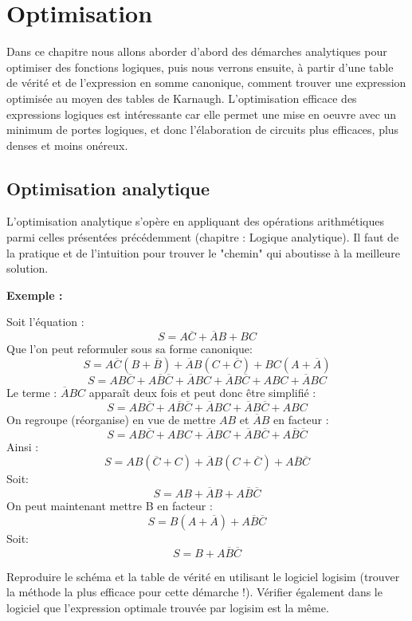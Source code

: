 \documentclass[a4paper,11pt]{book}
\theoremstyle{definition}
\theoremstyle{definition}
\begin{document}
\chapter{Optimisation}
Dans ce chapitre nous allons aborder d'abord des démarches analytiques pour optimiser des fonctions logiques, puis nous verrons ensuite, à partir d'une table de vérité et de l'expression en somme canonique, comment trouver une expression optimisée au moyen des tables de Karnaugh.
L'optimisation efficace des expressions logiques est intéressante car elle permet une mise en oeuvre avec un minimum de portes logiques, et donc l'élaboration de circuits plus efficaces, plus denses et moins onéreux.

\section{Optimisation analytique}
L'optimisation analytique s'opère en appliquant des opérations arithmétiques parmi celles présentées précédemment (chapitre : Logique analytique). Il faut de la pratique et de l'intuition pour trouver le "chemin" qui aboutisse à la meilleure solution.

\textbf{Exemple :}

Soit l'équation :
\[ S = A\overline{C} + \overline{A}B + BC\]
Que l'on peut reformuler sous sa forme canonique:
\[ S = A\overline{C}(B+\overline{B}) + \overline{A}B(C+\overline{C}) + BC(A+\overline{A}) \]
\[ S = AB\overline{C} + A\overline{B}\overline{C} + \overline{A}BC + \overline{A}B\overline{C}+ABC+\overline{A}BC \]
Le terme : $\overline{A}BC$ apparaît deux fois et peut donc être simplifié :
\[ S = AB\overline{C} + A\overline{B}\overline{C} + \overline{A}BC + \overline{A}B\overline{C}+ABC \]
On regroupe (réorganise) en vue de mettre $AB$ et $\overline{A}B$ en facteur :
\[ S = AB\overline{C} + ABC + \overline{A}BC + \overline{A}B\overline{C} + A\overline{B}\overline{C}\]
Ainsi : 
\[ S = AB(\overline{C} + C) +  \overline{A}B(C + \overline{C}) + A\overline{B}\overline{C}\]
Soit:
\[ S = AB +  \overline{A}B + A\overline{B}\overline{C}\]
On peut maintenant mettre B en facteur :
\[ S = B(A +  \overline{A}) + A\overline{B}\overline{C}\]
Soit:
\[ S = B + A\overline{B}\overline{C}\]

\begin{exercise}
Reproduire le schéma et la table de vérité en utilisant le logiciel logisim (trouver la méthode la plus efficace pour cette démarche !). Vérifier également dans le logiciel que l'expression optimale trouvée par logisim est la même.

\end{exercise}
\end{document}
